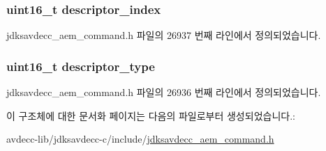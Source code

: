 \subsubsection[{\texorpdfstring{descriptor\+\_\+index}{descriptor_index}}]{\setlength{\rightskip}{0pt plus 5cm}uint16\+\_\+t descriptor\+\_\+index}\hypertarget{structjdksavdecc__aem__command__reboot_a042bbc76d835b82d27c1932431ee38d4}{}\label{structjdksavdecc__aem__command__reboot_a042bbc76d835b82d27c1932431ee38d4}


jdksavdecc\+\_\+aem\+\_\+command.\+h 파일의 26937 번째 라인에서 정의되었습니다.

\subsubsection[{\texorpdfstring{descriptor\+\_\+type}{descriptor_type}}]{\setlength{\rightskip}{0pt plus 5cm}uint16\+\_\+t descriptor\+\_\+type}\hypertarget{structjdksavdecc__aem__command__reboot_ab7c32b6c7131c13d4ea3b7ee2f09b78d}{}\label{structjdksavdecc__aem__command__reboot_ab7c32b6c7131c13d4ea3b7ee2f09b78d}


jdksavdecc\+\_\+aem\+\_\+command.\+h 파일의 26936 번째 라인에서 정의되었습니다.



이 구조체에 대한 문서화 페이지는 다음의 파일로부터 생성되었습니다.\+:\begin{DoxyCompactItemize}
\item 
avdecc-\/lib/jdksavdecc-\/c/include/\hyperlink{jdksavdecc__aem__command_8h}{jdksavdecc\+\_\+aem\+\_\+command.\+h}\end{DoxyCompactItemize}
